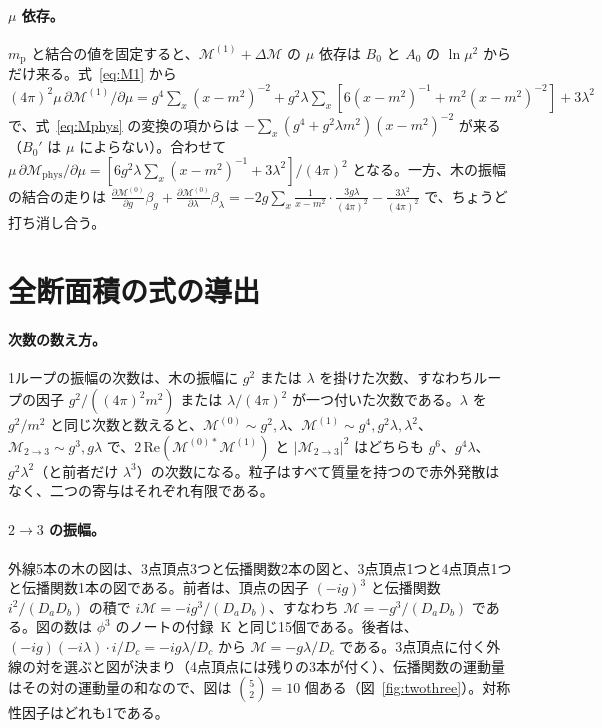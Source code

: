 \documentclass[a4paper,10pt]{ltjsarticle}
\begin{document}
\paragraph{$\mu$ 依存。}$m_{\mathrm p}$ と結合の値を固定すると、$\mathcal{M}^{(1)}+\Delta\mathcal{M}$ の $\mu$ 依存は $B_0$ と $A_0$ の $\ln\mu^2$ からだけ来る。式~\eqref{eq:M1} から $(4\pi)^2\mu\,\partial\mathcal{M}^{(1)}/\partial\mu=g^4\sum_x(x-m^2)^{-2}+g^2\lambda\sum_x[6(x-m^2)^{-1}+m^2(x-m^2)^{-2}]+3\lambda^2$ で、式~\eqref{eq:Mphys} の変換の項からは $-\sum_x(g^4+g^2\lambda m^2)(x-m^2)^{-2}$ が来る（$B_0'$ は $\mu$ によらない）。合わせて $\mu\,\partial\mathcal{M}_{\mathrm{phys}}/\partial\mu=[6g^2\lambda\sum_x(x-m^2)^{-1}+3\lambda^2]/(4\pi)^2$ となる。一方、木の振幅の結合の走りは $\frac{\partial\mathcal{M}^{(0)}}{\partial g}\beta_g+\frac{\partial\mathcal{M}^{(0)}}{\partial\lambda}\beta_\lambda=-2g\sum_x\frac{1}{x-m^2}\cdot\frac{3g\lambda}{(4\pi)^2}-\frac{3\lambda^2}{(4\pi)^2}$ で、ちょうど打ち消し合う。

\section{全断面積の式の導出}\label{app:sigma}

\paragraph{次数の数え方。}1ループの振幅の次数は、木の振幅に $g^2$ または $\lambda$ を掛けた次数、すなわちループの因子 $g^2/((4\pi)^2m^2)$ または $\lambda/(4\pi)^2$ が一つ付いた次数である。$\lambda$ を $g^2/m^2$ と同じ次数と数えると、$\mathcal{M}^{(0)}\sim g^2,\lambda$、$\mathcal{M}^{(1)}\sim g^4,g^2\lambda,\lambda^2$、$\mathcal{M}_{2\to3}\sim g^3,g\lambda$ で、$2\,\mathrm{Re}(\mathcal{M}^{(0)*}\mathcal{M}^{(1)})$ と $|\mathcal{M}_{2\to3}|^2$ はどちらも $g^6$、$g^4\lambda$、$g^2\lambda^2$（と前者だけ $\lambda^3$）の次数になる。粒子はすべて質量を持つので赤外発散はなく、二つの寄与はそれぞれ有限である。

\paragraph{$2\to3$ の振幅。}外線5本の木の図は、3点頂点3つと伝播関数2本の図と、3点頂点1つと4点頂点1つと伝播関数1本の図である。前者は、頂点の因子 $(-ig)^3$ と伝播関数 $i^2/(D_aD_b)$ の積で $i\mathcal{M}=-ig^3/(D_aD_b)$、すなわち $\mathcal{M}=-g^3/(D_aD_b)$ である。図の数は $\phi^3$ のノートの付録~K と同じ15個である。後者は、$(-ig)(-i\lambda)\cdot i/D_c=-ig\lambda/D_c$ から $\mathcal{M}=-g\lambda/D_c$ である。3点頂点に付く外線の対を選ぶと図が決まり（4点頂点には残りの3本が付く）、伝播関数の運動量はその対の運動量の和なので、図は $\binom52=10$ 個ある（図~\ref{fig:twothree}）。対称性因子はどれも1である。
\end{document}
